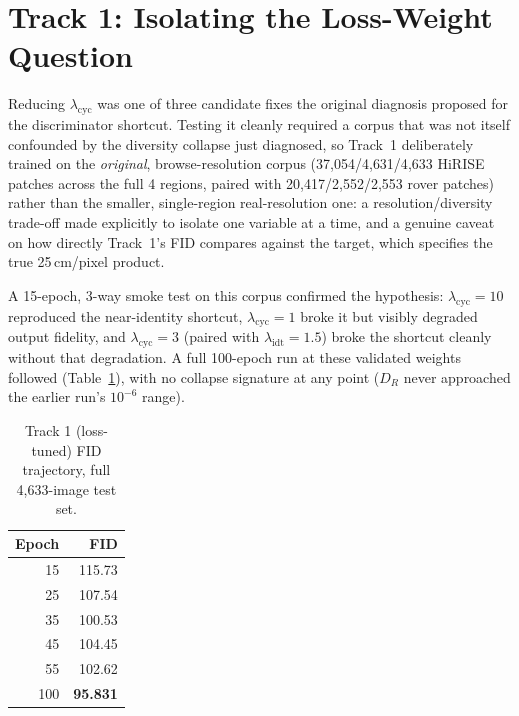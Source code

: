 \section{Track 1: Isolating the Loss-Weight Question}
\label{sec:track1}

Reducing $\lambda_{\mathrm{cyc}}$ was one of three candidate fixes the original diagnosis proposed for the discriminator shortcut. Testing it cleanly required a corpus that was not itself confounded by the diversity collapse just diagnosed, so Track~1 deliberately trained on the \emph{original}, browse-resolution corpus (37{,}054/4{,}631/4{,}633 HiRISE patches across the full 4 regions, paired with 20{,}417/2{,}552/2{,}553 rover patches) rather than the smaller, single-region real-resolution one: a resolution/diversity trade-off made explicitly to isolate one variable at a time, and a genuine caveat on how directly Track~1's FID compares against the target, which specifies the true 25\,cm/pixel product.

A 15-epoch, 3-way smoke test on this corpus confirmed the hypothesis: $\lambda_{\mathrm{cyc}}=10$ reproduced the near-identity shortcut, $\lambda_{\mathrm{cyc}}=1$ broke it but visibly degraded output fidelity, and $\lambda_{\mathrm{cyc}}=3$ (paired with $\lambda_{\mathrm{idt}}=1.5$) broke the shortcut cleanly without that degradation. A full 100-epoch run at these validated weights followed (Table~\ref{tab:track1-fid}), with no collapse signature at any point ($D_R$ never approached the earlier run's $10^{-6}$ range).

\begin{table}[H]
  \caption{Track 1 (loss-tuned) FID trajectory, full 4{,}633-image test set.}
  \label{tab:track1-fid}
  \centering
  \begin{tabular}{rr}
    \toprule
    Epoch & FID \\
    \midrule
    15  & 115.73 \\
    25  & 107.54 \\
    35  & 100.53 \\
    45  & 104.45 \\
    55  & 102.62 \\
    100 & \textbf{95.831} \\
    \bottomrule
  \end{tabular}
\end{table}

